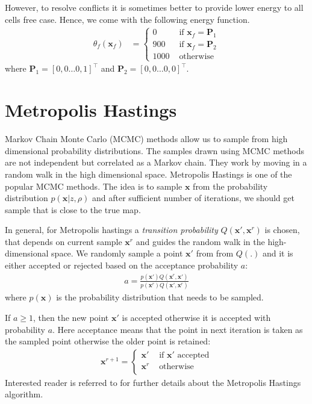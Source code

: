 \documentclass[letterpaper, 10 pt, conference]{ieeeconf} %
\newcommand{\vect}[1]{\mathbf{#1}}
\begin{document}
However, to resolve conflicts it is sometimes better to provide lower energy to all cells free case. Hence, we come with the following energy function.
\begin{align}
  \theta_f(\vect{x}_f) &= \begin{cases}
                     0 & \text{ if } \vect{x}_f = \vect{P}_1\\
                   900 & \text{ if } \vect{x}_f = \vect{P}_2\\
                  1000 & \text{ otherwise}
  \end{cases}
\end{align}
where $\vect{P}_1 = [0, 0 \dots 0, 1]^\top$ and $\vect{P}_2 = [0, 0 \dots 0, 0]^\top$.
\section{Metropolis Hastings}
Markov Chain Monte Carlo (MCMC) methods allow us to sample from high dimensional probability distributions. The samples drawn using MCMC methods are not independent but correlated as a Markov chain. They work by moving in a random walk in the high dimensional space. Metropolis Hastings is one of the popular MCMC methods. The idea is to sample $\vect{x}$ from the probability distribution $p(\vect{x}|z, \rho)$ and after sufficient number of iterations, we should get sample that is close to the true map.

In general, for Metropolis hastings a \emph{transition probability} $Q(\vect{x}',
\vect{x}^r)$ is chosen, that depends on current sample $\vect{x}^r$ and guides
the random walk in the high-dimensional space. We randomly sample a point
$\vect{x}'$ from from $Q(.)$ and it is either accepted or rejected based on the
acceptance probability $a$:
\begin{align}
  a = \frac{p(\vect{x}')Q(\vect{x}^r, \vect{x}')}
  {p(\vect{x}^r)Q(\vect{x}', \vect{x}^r)}
\end{align}
where $p(\vect{x})$ is the probability distribution that needs to be sampled.

If $a \ge 1$, then the new point $\vect{x}'$ is accepted otherwise it is accepted with probability $a$. Here acceptance means that the point in next iteration is taken as the sampled point otherwise the older point is retained:
\begin{align}
  \vect{x}^{r+1} = \begin{cases}
    \vect{x}' & \text{ if $\vect{x}'$ accepted}\\
    \vect{x}^r & \text{ otherwise}\\
  \end{cases}
\end{align}
Interested reader is referred to \cite{mackay1998introduction} for further details about the Metropolis Hastings algorithm.
\end{document}
